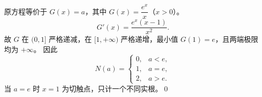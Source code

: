 原方程等价于 $G(x)=a$，其中 $G(x)=\dfrac{e^x}{x}$（$x>0$）。
\[
G'(x)=\frac{e^x(x-1)}{x^2}.
\]
故 $G$ 在 $(0,1]$ 严格递减，在 $[1,+\infty)$ 严格递增，最小值 $G(1)=e$，且两端极限均为 $+\infty$。
因此
\[
\boxed{N(a)=\begin{cases}0,&a<e,\\1,&a=e,\\2,&a>e.\end{cases}}
\]
当 $a=e$ 时 $x=1$ 为切触点，只计一个不同实根。\qed
